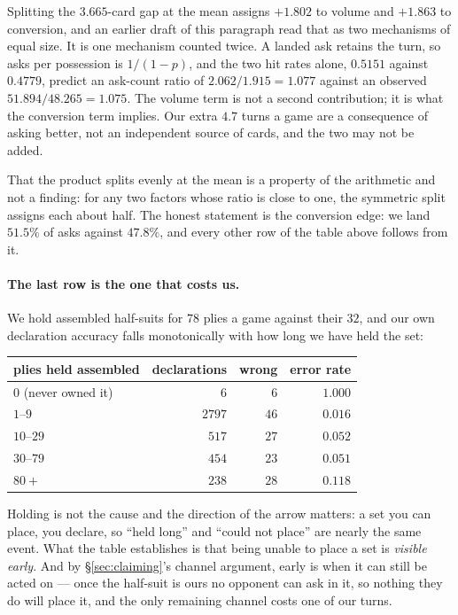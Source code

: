 \documentclass[11pt,letterpaper]{article}
\begin{document}
\noindent Splitting the $3.665$-card gap at the mean assigns $+1.802$ to
volume and $+1.863$ to conversion, and an earlier draft of this paragraph read
that as two mechanisms of equal size. It is one mechanism counted twice. A
landed ask retains the turn, so asks per possession is $1/(1-p)$, and the two
hit rates alone, $0.5151$ against $0.4779$, predict an ask-count ratio of
$2.062/1.915 = 1.077$ against an observed $51.894/48.265 = 1.075$. The volume
term is not a second contribution; it is what the conversion term implies. Our
extra $4.7$ turns a game are a consequence of asking better, not an
independent source of cards, and the two may not be added.

That the product splits evenly at the mean is a property of the arithmetic and
not a finding: for any two factors whose ratio is close to one, the
symmetric split assigns each about half. The honest statement is the
conversion edge: we land $51.5\%$ of asks against $47.8\%$, and every other
row of the table above follows from it.

\paragraph{The last row is the one that costs us.} We hold assembled
half-suits for $78$ plies a game against their $32$, and our own declaration
accuracy falls monotonically with how long we have held the set:

\begin{center}
\small
\begin{tabular}{lrrr}
\toprule
plies held assembled & declarations & wrong & error rate \\
\midrule
$0$ (never owned it) & $6$ & $6$ & $1.000$ \\
$1$--$9$ & $2797$ & $46$ & $0.016$ \\
$10$--$29$ & $517$ & $27$ & $0.052$ \\
$30$--$79$ & $454$ & $23$ & $0.051$ \\
$80+$ & $238$ & $28$ & $\mathbf{0.118}$ \\
\bottomrule
\end{tabular}
\end{center}

\noindent Holding is not the cause and the direction of the arrow matters: a
set you can place, you declare, so ``held long'' and ``could not place'' are
nearly the same event. What the table establishes is that being unable to
place a set is \emph{visible early}. And by \S\ref{sec:claiming}'s channel
argument, early is when it can still be acted on --- once the half-suit is
ours no opponent can ask in it, so nothing they do will place it, and the only
remaining channel costs one of our turns.
\end{document}
